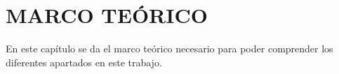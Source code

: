 \chapter{MARCO TEÓRICO}
En este capítulo se da el marco teórico necesario para poder comprender los diferentes apartados en este trabajo.